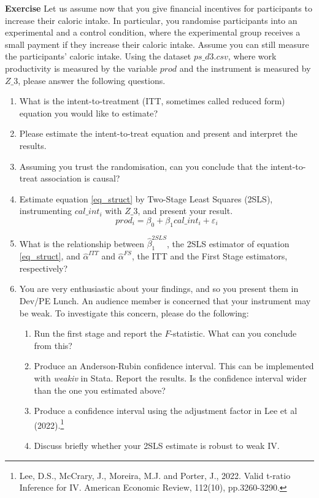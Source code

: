 \documentclass[10pt]{article}
\newcounter{exercise}
\newenvironment{exercise}%
{%
	\refstepcounter{exercise}%
	\textbf{Exercise \theexercise}%
	}%
{
 \par\vspace{\baselineskip}%
\noindent\ignorespacesafterend
}
\begin{document}

\begin{exercise}\label{2sls}
	Let us assume now that you give financial incentives for participants to increase their caloric intake. In particular, you randomise participants into an experimental and a control condition, where the experimental group receives a small payment if they increase their caloric intake. Assume you can still measure the participants' caloric intake. Using the dataset $ps\_d3.csv$, where work productivity is measured by the variable $ prod $ and the instrument is measured by $ Z\_3 $, please answer the following questions.
	\begin{enumerate}
		\item What is the intent-to-treatment (ITT, sometimes called reduced form) equation you would like to estimate?
		\item Please estimate the intent-to-treat equation and present and interpret the results.
		\item Assuming you trust the randomisation, can you conclude that the intent-to-treat association is causal?
		\item Estimate equation \ref{eq_struct} by Two-Stage Least Squares (2SLS), instrumenting $ cal\_int_{i} $ with $  Z\_3 $, and present your result.
		\begin{equation}\label{eq_struct}
			prod_{i} = \beta_{0} + \beta_{1} cal\_int_{i} + \varepsilon_{i}
		\end{equation}
		\item What is the relationship between $ \hat{\beta}_{1}^{2SLS} $, the 2SLS estimator of equation \ref{eq_struct}, and $ \hat{\alpha}^{ITT} $ and $ \hat{\alpha}^{FS} $, the ITT and the First Stage estimators, respectively?
		\item You are very enthusiastic about your findings, and so you present them in Dev/PE Lunch. An audience member is concerned that your instrument may be weak. To investigate this concern, please do the following:
		\begin{enumerate}
			\item Run the first stage and report the $F$-statistic. What can you conclude from this?
			\item Produce an Anderson-Rubin confidence interval. This can be implemented with \textit{weakiv} in Stata. Report the results. Is the confidence interval wider than the one you estimated above?
			\item Produce a confidence interval using the adjustment factor in Lee et al (2022).\footnote{Lee, D.S., McCrary, J., Moreira, M.J. and Porter, J., 2022. Valid t-ratio Inference for IV. American Economic Review, 112(10), pp.3260-3290.} 
			\item Discuss briefly whether your 2SLS estimate is robust to weak IV.
		\end{enumerate}


\end{enumerate}
\end{exercise}
\end{document}
